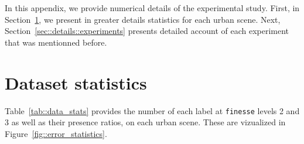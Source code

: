 \minitoc

\vfill

In this appendix, we provide numerical details of the experimental study.
First, in Section~\ref{sec::details::dataset_stats}, we present in greater details statistics for each urban scene.
Next, Section~\ref{sec::details::experiments} presents detailed account of each experiment that was mentionned before.

\clearpage

\section{Dataset statistics}
    \label{sec::details::dataset_stats}
    Table~\ref{tab::data_stats} provides the number of each label at \texttt{finesse} levels 2 and 3 as well as their presence ratios, on each urban scene.
    These are vizualized in Figure~\ref{fig::error_statistics}.\\

